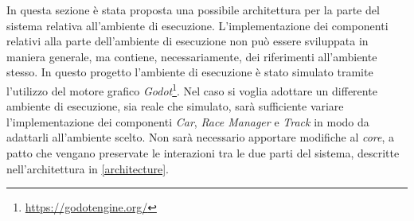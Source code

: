 \documentclass[a4paper,12pt]{article}
\begin{document}
In questa sezione è stata proposta una possibile architettura per la parte del sistema relativa all'ambiente di esecuzione. L'implementazione dei componenti relativi alla parte dell'ambiente di esecuzione non può essere sviluppata in maniera generale, ma contiene, necessariamente, dei riferimenti all'ambiente stesso. In questo progetto l'ambiente di esecuzione è stato simulato tramite l'utilizzo del motore grafico \emph{Godot}\footnote{\url{https://godotengine.org/}}. Nel caso si voglia adottare un differente ambiente di esecuzione, sia reale che simulato, sarà sufficiente variare l'implementazione dei componenti \emph{Car}, \emph{Race Manager} e \emph{Track} in modo da adattarli all'ambiente scelto. Non sarà necessario apportare modifiche al \emph{core}, a patto che vengano preservate le interazioni tra le due parti del sistema, descritte nell'architettura in \autoref{architecture}.
\end{document}
